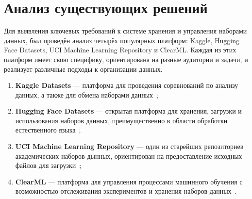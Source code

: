 \section{Анализ существующих решений}

Для выявления ключевых требований к системе хранения и управления наборами данных, был проведён анализ 
четырёх популярных платформ: Kaggle, Hugging Face Datasets, UCI Machine Learning Repository и ClearML. 
Каждая из этих платформ имеет свою специфику, ориентирована на разные аудитории и задачи, и реализует 
различные подходы к организации данных.


\begin{enumerate}
    \item \textbf{Kaggle Datasets} --- платформа для проведения соревнований по анализу данных, а также для обмена наборами данных~\cite{kaggle};

    \item \textbf{Hugging Face Datasets} --- открытая платформа для хранения, загрузки и использования наборов данных, преимущественно в области обработки естественного языка~\cite{hg};

    \item \textbf{UCI Machine Learning Repository} --- один из старейших репозиториев академических наборов дынных, ориентирован на предоставление исходных файлов для загрузки~\cite{uci};

    \item \textbf{ClearML} — платформа для управления процессами машинного обучения с возможностью отслеживания экспериментов и хранения наборов данных~\cite{cml}.
\end{enumerate}

